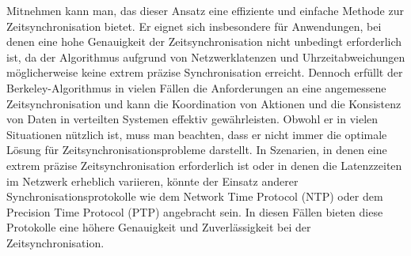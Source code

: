 \documentclass[../vs-script-first-v01.tex]{subfiles}
\begin{document}
Mitnehmen kann man, das dieser Ansatz eine effiziente und einfache Methode zur Zeitsynchronisation bietet. Er eignet sich insbesondere für Anwendungen, bei denen eine hohe Genauigkeit der Zeitsynchronisation nicht unbedingt erforderlich ist, da der Algorithmus aufgrund von Netzwerklatenzen und Uhrzeitabweichungen möglicherweise keine extrem präzise Synchronisation erreicht. Dennoch erfüllt der Berkeley-Algorithmus in vielen Fällen die Anforderungen an eine angemessene Zeitsynchronisation und kann die Koordination von Aktionen und die Konsistenz von Daten in verteilten Systemen effektiv gewährleisten.
Obwohl er in vielen Situationen nützlich ist, muss man beachten, dass er nicht immer die optimale Lösung für Zeitsynchronisationsprobleme darstellt. In Szenarien, in denen eine extrem präzise Zeitsynchronisation erforderlich ist oder in denen die Latenzzeiten im Netzwerk erheblich variieren, könnte der Einsatz anderer Synchronisationsprotokolle wie dem Network Time Protocol (NTP) oder dem Precision Time Protocol (PTP) angebracht sein. In diesen Fällen bieten diese Protokolle eine höhere Genauigkeit und Zuverlässigkeit bei der Zeitsynchronisation.
\\\\
\end{document}
